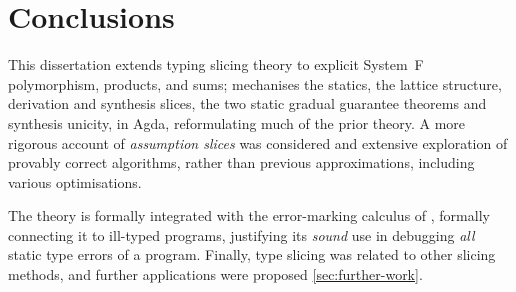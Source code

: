 \section{Conclusions}
\label{sec:conclusions}

This dissertation extends typing slicing theory to explicit System~F polymorphism, products, and sums; mechanises the statics, the lattice structure, derivation and synthesis slices, the two static gradual guarantee theorems and synthesis unicity, in Agda, reformulating much of the prior theory. A more rigorous account of \emph{assumption slices} was considered and extensive exploration of provably correct algorithms, rather than previous approximations, including various optimisations.

The theory is formally integrated with the error-marking calculus of \textcite{Marking2024}, formally connecting it to ill-typed programs, justifying its \textit{sound} use in debugging \textit{all} static type errors of a program. Finally, type slicing was related to other slicing methods, and further applications were proposed \cref{sec:further-work}.

